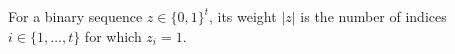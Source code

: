 \begin{definition}
For a binary sequence \(z\in\{0,1\}^t\), its weight \(|z|\) is the number of indices \(i\in\{1,\ldots,t\}\) for which \(z_i=1\).
\end{definition}
